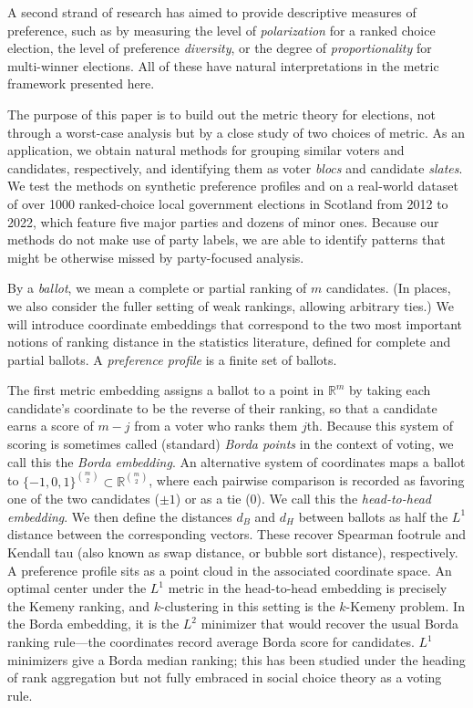 \documentclass{amsart}
\newcommand{\R}{\mathbb{R}}
\theoremstyle{plain}
\theoremstyle{definition}
\theoremstyle{remark}
\begin{document}
A second strand of research has aimed to provide descriptive measures of preference, such as by measuring the level of {\em polarization} for a ranked choice election,  the level of preference {\em diversity}, or the degree of {\em proportionality} for multi-winner elections.  All of these have natural interpretations in the metric framework presented here.

The purpose of this paper is to 
build out the metric theory for elections, not through a worst-case analysis but by a close study of two choices of metric.
As an application, we obtain natural methods for grouping similar voters and candidates, respectively, and identifying them as voter {\em blocs} and candidate {\em slates}.  
We test the methods on synthetic preference profiles and on a real-world dataset of over 1000 ranked-choice local government elections in Scotland from 2012 to 2022, which feature five major parties and dozens of minor ones.
Because our methods do not make use of party labels, we are able to identify patterns that might be otherwise missed by party-focused analysis.  

By a {\em ballot}, we mean a complete or partial ranking of $m$ candidates.  (In places, we also consider the fuller setting of weak rankings, allowing arbitrary ties.)
We will introduce coordinate embeddings that correspond to the two most important notions of ranking distance in the statistics literature, defined for complete and partial ballots.
A {\em preference profile} is a finite set of ballots.

The first metric embedding assigns a ballot to a point in $\R^m$ by taking each candidate's coordinate to be the reverse of their ranking, so that a candidate earns a score of $m-j$ from a voter who ranks them $j$th.  Because this system of scoring is sometimes called (standard) {\em Borda points} in the context of voting, we call this the {\em Borda embedding}.  An alternative system of coordinates maps a ballot to $\{-1,0,1\}^{\binom m2}\subset \R^{\binom m2}$, where each pairwise comparison is recorded as favoring one of the two candidates ($\pm 1$) or as a tie ($0$).  We call this the {\em head-to-head embedding}. We then define the distances $d_B$ and $d_H$ between ballots as half the $L^1$ distance between the corresponding vectors.  These recover  Spearman footrule and Kendall tau  (also known as swap distance, or bubble sort distance), respectively.  A preference profile sits as a point cloud in the associated coordinate space.  An optimal center under the $L^1$ metric in the head-to-head embedding is precisely the Kemeny ranking, and $k$-clustering in this setting is the $k$-Kemeny problem.
In the Borda embedding, it is the $L^2$ minimizer that would recover the usual Borda ranking rule---the coordinates record average Borda score for candidates.  $L^1$ minimizers give a Borda median ranking; this has been studied under the heading of rank aggregation but not fully embraced in social choice theory as a voting rule.  
\end{document}
